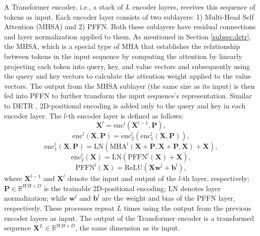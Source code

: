 \documentclass[journal]{IEEEtran}
\begin{document}
A Transformer encoder, i.e., a stack of $L$ encoder layers, receives this sequence of tokens as input.
Each encoder layer consists of two sublayers: 1) Multi-Head Self Attention (MHSA) and 2) PFFN.
Both these sublayers have residual connections and layer normalization applied to them.
As mentioned in Section \ref{subsec:detr}, the MHSA, which is a special type of MHA that establishes the relationship between tokens in the input sequence by computing the attention by linearly projecting each token into query, key, and value vectors and subsequently using the query and key vectors to calculate the attention weight applied to the value vectors. 
The output from the MHSA sublayer (the same size as its input) is then fed into PFFN to further transform the input sequence's representation. 
Similar to DETR \cite{Carion2020}, 2D-positional encoding is added only to the query and key in each encoder layer. 
The $l$-th encoder layer is defined as follows:
\begin{equation}
     \mathbf{X}^{l} = \text{enc}^l(\mathbf{X}^{l-1}, \mathbf{P}),
\end{equation}
\begin{equation}
    \text{enc}^l(\mathbf{X}, \mathbf{P}) = \text{enc}^l_2(\text{enc}^l_1(\mathbf{X}, \mathbf{P})),
\end{equation}
\begin{equation}
    \text{enc}^l_1(\mathbf{X}, \mathbf{P}) = \text{LN}(\text{MHA}^l(\mathbf{X} + \mathbf{P}, \mathbf{X} + \mathbf{P}, \mathbf{X}) + \mathbf{X}),
\end{equation}
\begin{equation}
    \text{enc}^l_2(\mathbf{X}) = \text{LN}(\text{PFFN}^l(\mathbf{X}) + \mathbf{X}),
\end{equation}
\begin{equation}
    \text{PFFN}^l(\mathbf{X}) = \text{ReLU}(\mathbf{X}\mathbf{w}^l + \mathbf{b}^l),
\end{equation}
where $\mathbf{X}^{l-1}$ and $\mathbf{X}^{l}$ denote the input and output of the $l$-th layer, respectively; $\mathbf{P} \in \mathbb{R}^{WH \times D}$ is the trainable 2D-positional encoding; $\text{LN}$ denotes layer normalization; while $\mathbf{w}^l$ and $\mathbf{b}^l$ are the weight and bias of the PFFN layer, respectively.
These processes repeat $L$ times using the output from the previous encoder layers as input. 
The output of the Transformer encoder is a transformed sequence $\mathbf{X}^L \in \mathbb{R}^{WH \times D}$, the same dimension as its input.
\end{document}
